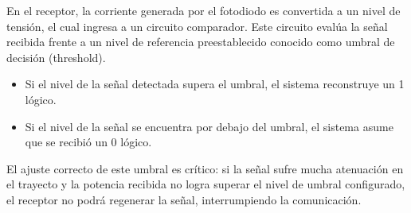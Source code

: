 En el receptor, la corriente generada por el fotodiodo es convertida a un nivel de tensión, el cual ingresa a un circuito comparador. Este circuito evalúa la señal recibida frente a un nivel de referencia preestablecido conocido como umbral de decisión (threshold). 

\begin{itemize}
    \item Si el nivel de la señal detectada supera el umbral, el sistema reconstruye un 1 lógico.
    \item Si el nivel de la señal se encuentra por debajo del umbral, el sistema asume que se recibió un 0 lógico.
\end{itemize}

El ajuste correcto de este umbral es crítico: si la señal sufre mucha atenuación en el trayecto y la potencia recibida no logra superar el nivel de umbral configurado, el receptor no podrá regenerar la señal, interrumpiendo la comunicación.